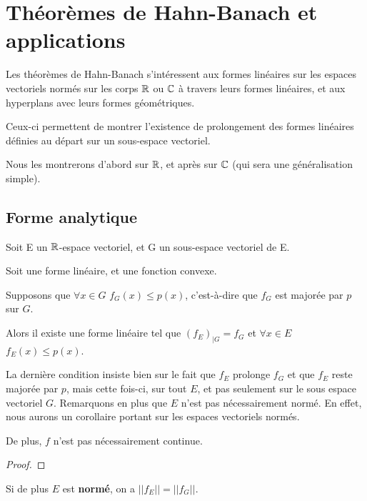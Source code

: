 \chapter{Théorèmes de Hahn-Banach et applications}

Les théorèmes de Hahn-Banach s'intéressent aux formes linéaires sur les espaces
vectoriels normés sur les corps $\mathbb{R}$ ou $\mathbb{C}$ à travers leurs formes
linéaires, et aux hyperplans avec leurs formes géométriques.

Ceux-ci permettent de montrer l'existence de prolongement des formes linéaires
définies au départ sur un sous-espace vectoriel.

Nous les montrerons d'abord sur $\mathbb{R}$, et après sur $\mathbb{C}$ (qui sera une
généralisation simple).

\section{Forme analytique}

\begin{theorem} 
	Soit E un $\mathbb{R}$-espace vectoriel, et G un sous-espace vectoriel de E.

	Soit  une forme linéaire, et
	 une fonction convexe.

	Supposons que $\forall x \in G$ $f_{G}(x) \leq p(x)$, c'est-à-dire que
	$f_{G}$ est majorée par $p$ sur $G$.

	Alors il existe une forme linéaire  tel que
	$(f_{E})_{|G} = f_{G}$ et $\forall x \in E$ $f_{E}(x) \leq p(x)$.
	\label{hahn-banach-analytic-1}
\end{theorem}

La dernière condition insiste bien sur le fait que $f_{E}$ prolonge $f_{G}$ et
que $f_{E}$ reste majorée par $p$, mais cette fois-ci, sur tout $E$, et pas
seulement sur le sous espace vectoriel $G$.
Remarquons en plus que $E$ n'est pas nécessairement normé. En effet, nous aurons
un corollaire portant sur les espaces vectoriels normés.

De plus, $f$ n'est pas nécessairement continue.

\begin{proof}
	
\end{proof}

\begin{corollary}
	Si de plus $E$ est \textbf{normé}, on a $||f_{E}|| = ||f_{G}||$.
\end{corollary}

